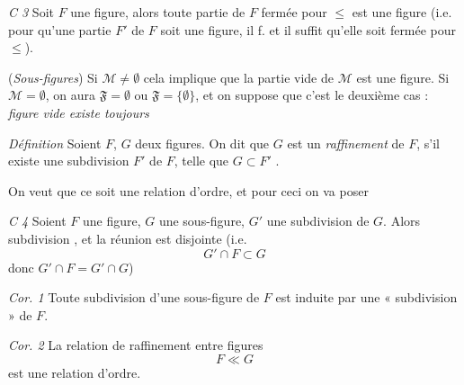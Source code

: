 \documentclass[11pt,a4paper]{article}
\begin{document}

\emph{C 3} \quad Soit $F$ une figure, alors toute partie de $F$ fermée pour $\leq$ est une figure (i.e. pour qu'une partie $F'$ de $F$ soit une figure, il f. et il suffit qu'elle soit fermée pour $\leq$).

(\emph{Sous-figures}) Si $\mathcal{M} \neq \emptyset$ cela implique que la partie vide de $\mathcal{M}$ est une figure. Si $\mathcal{M} = \emptyset$,  on aura $\mathfrak{F} = \emptyset$ \struck{\ill{}} ou $\mathfrak{F} = \{\emptyset\}$, et on suppose que c'est le deuxième cas : \emph{figure vide existe toujours}

\emph{Définition} \quad Soient $F$, $G$ deux figures. On dit que $G$ est un \emph{raffinement} de $F$, s'il existe une  subdivision $F'$ de $F$, telle que $G \subset F'$ .

On veut que ce soit une relation d'ordre, et pour ceci on va poser

\emph{C 4} \quad Soient $F$ une figure, $G$ une sous-figure,  $G'$ une subdivision de $G$. Alors   subdivision , et la réunion est disjointe (i.e. \struck{\ill{}}
\[
  \boxed{G' \cap F \subset G}
\]
donc $G' \cap F = G' \cap G$)

\emph{Cor. 1} \quad Toute  subdivision d'une sous-figure de $F$ est induite par une « subdivision » de $F$.

\emph{Cor. 2} \quad La relation de raffinement entre figures
\[
  F \ll G
\]
est une relation d'ordre.
\end{document}
